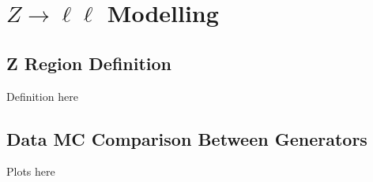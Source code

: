 \section{$Z\rightarrow\ell\ell$ Modelling}
\label{sec:zll}

\subsection{Z Region Definition}

Definition here

\subsection{Data MC Comparison Between Generators}

Plots here


